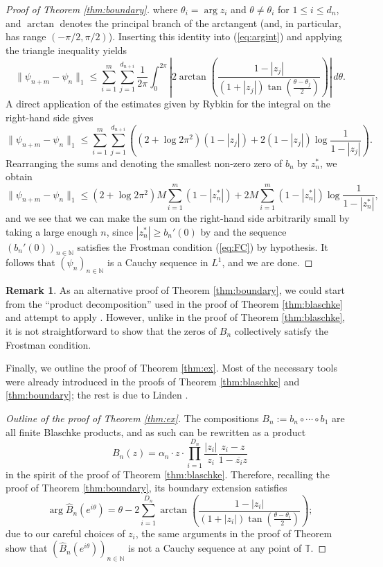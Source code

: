 \documentclass[a4paper,11pt]{article}
\theoremstyle{plain}
\theoremstyle{definition}
\theoremstyle{definition}
\newtheorem*{remark}{Remark}
\begin{document}
\begin{proof}[Proof of Theorem \ref{thm:boundary}]
where $\theta_i = \arg z_i$ and $\theta\neq\theta_i$ for $1\leq i \leq d_n$, and $\arctan$ denotes the principal branch of the arctangent (and, in particular, has range $(-\pi/2, \pi/2)$). Inserting this identity into (\ref{eq:argint}) and applying the triangle inequality yields
\[ \|\psi_{n+m} - \psi_n\|_1 \leq \sum_{i=1}^m\sum_{j=1}^{d_{n+i}}\frac{1}{2\pi}\int_0^{2\pi}\left|2\arctan\left(\frac{1 - |z_j|}{(1 + |z_j|)\tan\left(\frac{\theta - \theta_j}{2}\right)}\right)\right|\,d\theta. \]
A direct application of the estimates given by Rybkin for the integral on the right-hand side \cite[Proof of Theorem 3]{Ryb91} gives
\[ \|\psi_{n+m} - \psi_n\|_1 \leq \sum_{i=1}^m \sum_{j=1}^{d_{n+i}} \left((2 + \log 2\pi^2)(1 - |z_j|) + 2(1 - |z_j|)\log\frac{1}{1 - |z_j|}\right). \]
Rearranging the sums and denoting the smallest non-zero zero of $b_n$ by $z_n^*$, we obtain
\[ \|\psi_{n+m} - \psi_n\|_1 \leq (2 + \log 2\pi^2)M\sum_{i=1}^m (1 - |z_n^*|) + 2M\sum_{i=1}^m (1 - |z_n^*|)\log\frac{1}{1 - |z_n^*|}, \]
and we see that we can make the sum on the right-hand side arbitrarily small by taking a large enough $n$, since $|z_n^*| \geq b_n'(0)$ by \cite[Corollary 2.4]{BEFRS19} and the sequence $(b_n'(0))_{n\in\mathbb{N}}$ satisfies the Frostman condition (\ref{eq:FC}) by hypothesis. It follows that $(\psi_n)_{n\in\mathbb{N}}$ is a Cauchy sequence in $L^1$, and we are done.
\end{proof}
\begin{remark}
As an alternative proof of Theorem \ref{thm:boundary}, we could start from the ``product decomposition'' used in the proof of Theorem \ref{thm:blaschke} and attempt to apply \cite[Theorem 3]{Ryb91}. However, unlike in the proof of Theorem \ref{thm:blaschke}, it is not straightforward to show that the zeros of $B_n$ collectively satisfy the Frostman condition.
\end{remark}

Finally, we outline the proof of Theorem \ref{thm:ex}. Most of the necessary tools were already introduced in the proofs of Theorem \ref{thm:blaschke} and \ref{thm:boundary}; the rest is due to Linden \cite{Lin76}.
\begin{proof}[Outline of the proof of Theorem \ref{thm:ex}]
The compositions $B_n := b_n\circ\cdots\circ b_1$ are all finite Blaschke products, and as such can be rewritten as a product
\[ B_n(z) = \alpha_n\cdot z\cdot \prod_{i=1}^{D_n} \frac{|z_i|}{z_i}\frac{z_i - z}{1 - \overline{z_i}z} \]
in the spirit of the proof of Theorem \ref{thm:blaschke}. Therefore, recalling the proof of Theorem \ref{thm:boundary}, its boundary extension satisfies
\[ \arg \hat{B}_n(e^{i\theta}) = \theta - 2\sum_{i=1}^{D_n} \arctan\left(\frac{1 - |z_i|}{(1 + |z_i|)\tan\left(\frac{\theta - \theta_i}{2}\right)}\right); \]
due to our careful choices of $z_i$, the same arguments in the proof of Theorem \cite[Theorem]{Lin76} show that $(\hat{B}_n(e^{i\theta}))_{n\in\mathbb{N}}$ is not a Cauchy sequence at any point of $\mathbb{T}$.
\end{proof}
\end{document}
